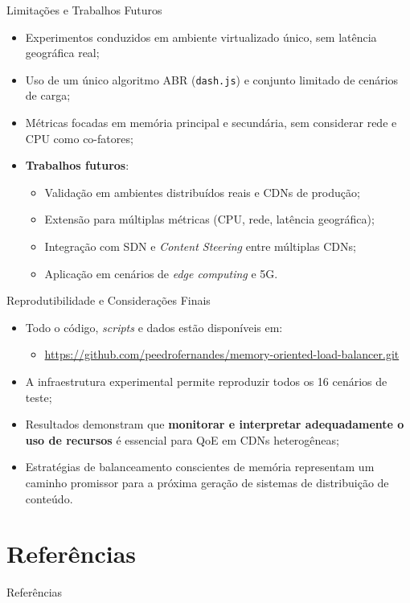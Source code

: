 \documentclass[10pt]{beamer}
\begin{document}
\begin{frame}{Limitações e Trabalhos Futuros}
    \begin{itemize}
        \item Experimentos conduzidos em ambiente virtualizado único, sem latência geográfica real;
        \item Uso de um único algoritmo ABR (\texttt{dash.js}) e conjunto limitado de cenários de carga;
        \item Métricas focadas em memória principal e secundária, sem considerar rede e CPU como co-fatores;
        \item \textbf{Trabalhos futuros}:
        \begin{itemize}
            \item Validação em ambientes distribuídos reais e CDNs de produção;
            \item Extensão para múltiplas métricas (CPU, rede, latência geográfica);
            \item Integração com SDN e \textit{Content Steering} entre múltiplas CDNs;
            \item Aplicação em cenários de \textit{edge computing} e 5G.
        \end{itemize}
    \end{itemize}
\end{frame}

\begin{frame}{Reprodutibilidade e Considerações Finais}
    \begin{itemize}
        \item Todo o código, \textit{scripts} e dados estão disponíveis em:
        \begin{itemize}
            \item \url{https://github.com/peedrofernandes/memory-oriented-load-balancer.git}
        \end{itemize}
        \item A infraestrutura experimental permite reproduzir todos os 16 cenários de teste;
        \item Resultados demonstram que \textbf{monitorar e interpretar adequadamente o uso de recursos} é essencial para QoE em CDNs heterogêneas;
        \item Estratégias de balanceamento conscientes de memória representam um caminho promissor para a próxima geração de sistemas de distribuição de conteúdo.
    \end{itemize}
\end{frame}


\section{Referências}

\begin{frame}[allowframebreaks]{Referências}
    
    
\end{frame}
\end{document}
